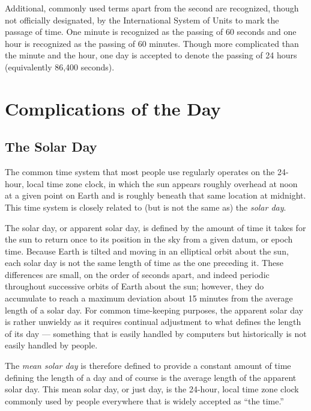 \documentclass[11pt,dvipsnames]{thesis}
\begin{document}
Additional, commonly used terms apart from the second are recognized, though not officially designated, by the International System of Units to mark the passage of time. One minute is recognized as the passing of 60 seconds and one hour is recognized as the passing of 60 minutes. Though more complicated than the minute and the hour, one day is accepted to denote the passing of 24 hours (equivalently 86,400 seconds).

\section{Complications of the Day}%
\subsection{The Solar Day}
The common time system that most people use regularly operates on the 24-hour, local time zone clock, in which the sun appears roughly overhead at noon at a given point on Earth and is roughly beneath that same location at midnight. This time system is closely related to (but is not the same as) the \textit{solar day}.

The solar day, or apparent solar day, is defined by the amount of time it takes for the sun to return once to its position in the sky from a given datum, or epoch time. Because Earth is tilted and moving in an elliptical orbit about the sun, each solar day is not the same length of time as the one preceding it. These differences are small, on the order of seconds apart, and indeed periodic throughout successive orbits of Earth about the sun; however, they do accumulate to reach a maximum deviation about 15 minutes from the average length of a solar day. For common time-keeping purposes, the apparent solar day is rather unwieldy as it requires continual adjustment to what defines the length of its day --- something that is easily handled by computers but historically is not easily handled by people.

The \textit{mean solar day} is therefore defined to provide a constant amount of time defining the length of a day and of course is the average length of the apparent solar day. This mean solar day, or just day, is the 24-hour, local time zone clock commonly used by people everywhere that is widely accepted as ``the time.''
\end{document}
